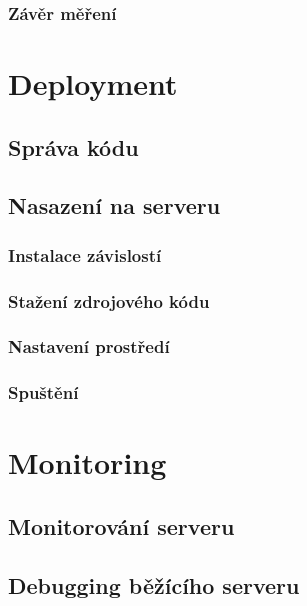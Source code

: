 \documentclass[thesis=M,czech]{FITthesis}[2012/06/26]
\begin{document}
\subsection{Závěr měření}

\chapter{Deployment}

\section{Správa kódu}
\section{Nasazení na serveru}
\subsection{Instalace závislostí}
\subsection{Stažení zdrojového kódu}
\subsection{Nastavení prostředí}
\subsection{Spuštění}

\chapter{Monitoring}

\section{Monitorování serveru}
\section{Debugging běžícího serveru}
\end{document}
